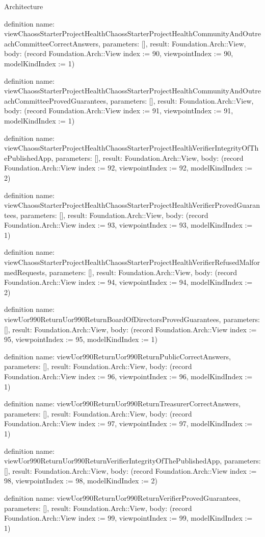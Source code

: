 \begin{lexlean}{Architecture}
\begin{semanticmodule}
definition{
  name: viewChaossStarterProjectHealthChaossStarterProjectHealthCommunityAndOutreachCommitteeCorrectAnswers,
  parameters: [],
  result: Foundation.Arch::View,
  body: (record Foundation.Arch::View {index := 90, viewpointIndex := 90, modelKindIndex := 1})
}

definition{
  name: viewChaossStarterProjectHealthChaossStarterProjectHealthCommunityAndOutreachCommitteeProvedGuarantees,
  parameters: [],
  result: Foundation.Arch::View,
  body: (record Foundation.Arch::View {index := 91, viewpointIndex := 91, modelKindIndex := 1})
}

definition{
  name: viewChaossStarterProjectHealthChaossStarterProjectHealthVerifierIntegrityOfThePublishedApp,
  parameters: [],
  result: Foundation.Arch::View,
  body: (record Foundation.Arch::View {index := 92, viewpointIndex := 92, modelKindIndex := 2})
}

definition{
  name: viewChaossStarterProjectHealthChaossStarterProjectHealthVerifierProvedGuarantees,
  parameters: [],
  result: Foundation.Arch::View,
  body: (record Foundation.Arch::View {index := 93, viewpointIndex := 93, modelKindIndex := 1})
}

definition{
  name: viewChaossStarterProjectHealthChaossStarterProjectHealthVerifierRefusedMalformedRequests,
  parameters: [],
  result: Foundation.Arch::View,
  body: (record Foundation.Arch::View {index := 94, viewpointIndex := 94, modelKindIndex := 2})
}

definition{
  name: viewUor990ReturnUor990ReturnBoardOfDirectorsProvedGuarantees,
  parameters: [],
  result: Foundation.Arch::View,
  body: (record Foundation.Arch::View {index := 95, viewpointIndex := 95, modelKindIndex := 1})
}

definition{
  name: viewUor990ReturnUor990ReturnPublicCorrectAnswers,
  parameters: [],
  result: Foundation.Arch::View,
  body: (record Foundation.Arch::View {index := 96, viewpointIndex := 96, modelKindIndex := 1})
}

definition{
  name: viewUor990ReturnUor990ReturnTreasurerCorrectAnswers,
  parameters: [],
  result: Foundation.Arch::View,
  body: (record Foundation.Arch::View {index := 97, viewpointIndex := 97, modelKindIndex := 1})
}

definition{
  name: viewUor990ReturnUor990ReturnVerifierIntegrityOfThePublishedApp,
  parameters: [],
  result: Foundation.Arch::View,
  body: (record Foundation.Arch::View {index := 98, viewpointIndex := 98, modelKindIndex := 2})
}

definition{
  name: viewUor990ReturnUor990ReturnVerifierProvedGuarantees,
  parameters: [],
  result: Foundation.Arch::View,
  body: (record Foundation.Arch::View {index := 99, viewpointIndex := 99, modelKindIndex := 1})
}


\end{semanticmodule}
\end{lexlean}
